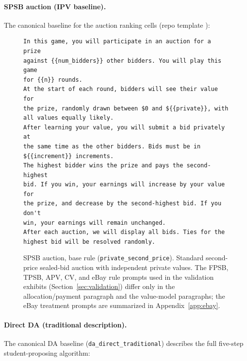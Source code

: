 \paragraph{SPSB auction (IPV baseline).} The canonical baseline for the auction ranking cells (repo template ):

\begin{figure}[H]
\begin{lstlisting}
In this game, you will participate in an auction for a prize
against {{num_bidders}} other bidders. You will play this game
for {{n}} rounds.
At the start of each round, bidders will see their value for
the prize, randomly drawn between $0 and ${{private}}, with
all values equally likely.
After learning your value, you will submit a bid privately at
the same time as the other bidders. Bids must be in
${{increment}} increments.
The highest bidder wins the prize and pays the second-highest
bid. If you win, your earnings will increase by your value for
the prize, and decrease by the second-highest bid. If you don't
win, your earnings will remain unchanged.
After each auction, we will display all bids. Ties for the
highest bid will be resolved randomly.
\end{lstlisting}
\caption{SPSB auction, base rule (\texttt{private\_second\_price}). Standard second-price sealed-bid auction with independent private values. The FPSB, TPSB, APV, CV, and eBay rule prompts used in the validation exhibits (Section~\ref{sec:validation}) differ only in the allocation/payment paragraph and the value-model paragraphs; the eBay treatment prompts are summarized in Appendix~\ref{app:ebay}.}
\label{fig:prompt-spsb-base}
\end{figure}

\paragraph{Direct DA (traditional description).} The canonical DA baseline (\texttt{da\_direct\_traditional}) describes the full five-step student-proposing algorithm:

